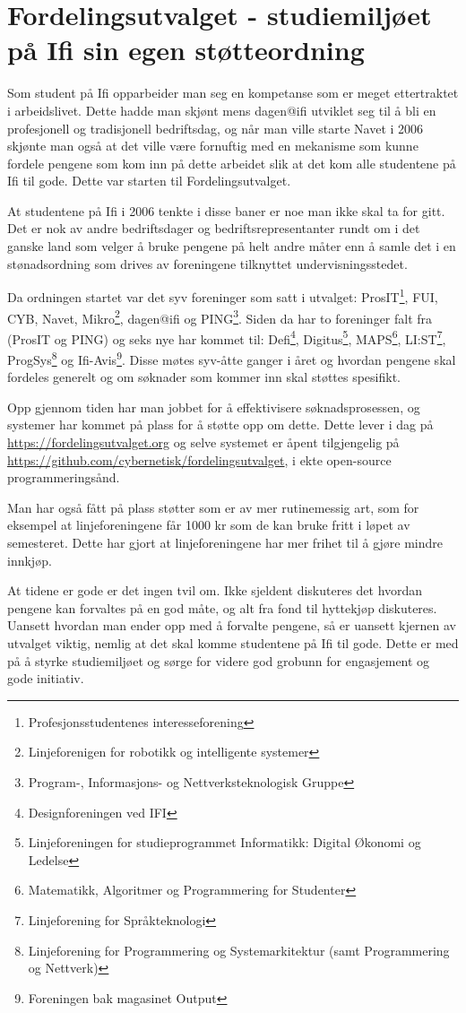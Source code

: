 \chapter[Fordelingsutvalget]{Fordelingsutvalget - studiemiljøet på Ifi sin egen støtteordning}

\author{Skrevet av Arne Hassel og Nikolas Papaioannou}

Som student på Ifi opparbeider man seg en kompetanse som er meget ettertraktet i arbeidslivet. Dette hadde man skjønt mens dagen@ifi utviklet seg til å bli en profesjonell og tradisjonell bedriftsdag, og når man ville starte Navet i 2006 skjønte man også at det ville være fornuftig med en mekanisme som kunne fordele pengene som kom inn på dette arbeidet slik at det kom alle studentene på Ifi til gode. Dette var starten til Fordelingsutvalget.

At studentene på Ifi i 2006 tenkte i disse baner er noe man ikke skal ta for gitt. Det er nok av andre bedriftsdager og bedriftsrepresentanter rundt om i det ganske land som velger å bruke pengene på helt andre måter enn å samle det i en stønadsordning som drives av foreningene tilknyttet undervisningsstedet.

Da ordningen startet var det syv foreninger som satt i utvalget: ProsIT\footnote{Profesjonsstudentenes interesseforening}, FUI, CYB, Navet, Mikro\footnote{Linjeforenigen for robotikk og intelligente systemer}, dagen@ifi og PING\footnote{Program-, Informasjons- og Nettverksteknologisk Gruppe}. Siden da har to foreninger falt fra (ProsIT og PING) og seks nye har kommet til: Defi\footnote{Designforeningen ved IFI}, Digitus\footnote{Linjeforeningen for studieprogrammet Informatikk: Digital Økonomi og Ledelse}, MAPS\footnote{Matematikk, Algoritmer og Programmering for Studenter}, LI:ST\footnote{Linjeforening for Språkteknologi}, ProgSys\footnote{Linjeforening for Programmering og Systemarkitektur (samt Programmering og Nettverk)} og Ifi-Avis\footnote{Foreningen bak magasinet Output}. Disse møtes syv-åtte ganger i året og hvordan pengene skal fordeles generelt og om søknader som kommer inn skal støttes spesifikt.

Opp gjennom tiden har man jobbet for å effektivisere søknadsprosessen, og systemer har kommet på plass for å støtte opp om dette. Dette lever i dag på \url{https://fordelingsutvalget.org} og selve systemet er åpent tilgjengelig på \url{https://github.com/cybernetisk/fordelingsutvalget}, i ekte open-source programmeringsånd.

Man har også fått på plass støtter som er av mer rutinemessig art, som for eksempel at linjeforeningene får 1000 kr som de kan bruke fritt i løpet av semesteret. Dette har gjort at linjeforeningene har mer frihet til å gjøre mindre innkjøp.

At tidene er gode er det ingen tvil om. Ikke sjeldent diskuteres det hvordan pengene kan forvaltes på en god måte, og alt fra fond til hyttekjøp diskuteres. Uansett hvordan man ender opp med å forvalte pengene, så er uansett kjernen av utvalget viktig, nemlig at det skal komme studentene på Ifi til gode. Dette er med på å styrke studiemiljøet og sørge for videre god grobunn for engasjement og gode initiativ.
